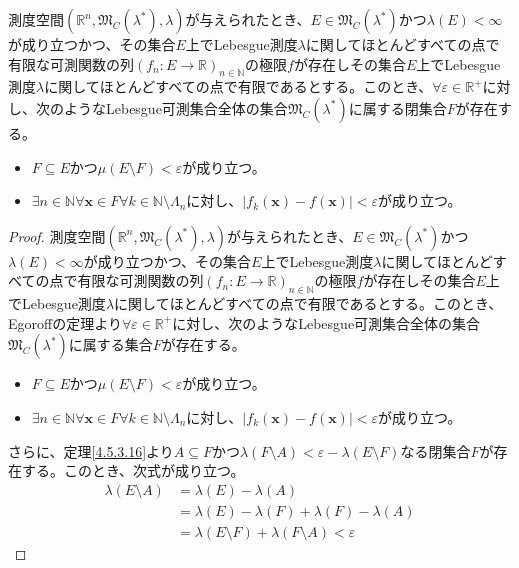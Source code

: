 \documentclass[dvipdfmx]{jsarticle}
\begin{document}
\begin{thm}\label{4.5.5.21}
測度空間$\left( \mathbb{R}^{n},\mathfrak{M}_{C}\left( \lambda^{*} \right),\lambda \right)$が与えられたとき、$E \in \mathfrak{M}_{C}\left( \lambda^{*} \right)$かつ$\lambda(E) < \infty$が成り立つかつ、その集合$E$上でLebesgue測度$\lambda$に関してほとんどすべての点で有限な可測関数の列$\left( f_{n}:E \rightarrow \mathbb{R} \right)_{n \in \mathbb{N}}$の極限$f$が存在しその集合$E$上でLebesgue測度$\lambda$に関してほとんどすべての点で有限であるとする。このとき、$\forall\varepsilon \in \mathbb{R}^{+}$に対し、次のようなLebesgue可測集合全体の集合$\mathfrak{M}_{C}\left( \lambda^{*} \right)$に属する閉集合$F$が存在する。
\begin{itemize}
\item
  $F \subseteq E$かつ$\mu(E \setminus F) < \varepsilon$が成り立つ。
\item
  $\exists n \in \mathbb{N}\forall\mathbf{x} \in F\forall k \in \mathbb{N} \setminus \varLambda_{n}$に対し、$\left| f_{k}\left( \mathbf{x} \right) - f\left( \mathbf{x} \right) \right| < \varepsilon$が成り立つ。
\end{itemize}
\end{thm}
\begin{proof}
測度空間$\left( \mathbb{R}^{n},\mathfrak{M}_{C}\left( \lambda^{*} \right),\lambda \right)$が与えられたとき、$E \in \mathfrak{M}_{C}\left( \lambda^{*} \right)$かつ$\lambda(E) < \infty$が成り立つかつ、その集合$E$上でLebesgue測度$\lambda$に関してほとんどすべての点で有限な可測関数の列$\left( f_{n}:E \rightarrow \mathbb{R} \right)_{n \in \mathbb{N}}$の極限$f$が存在しその集合$E$上でLebesgue測度$\lambda$に関してほとんどすべての点で有限であるとする。このとき、Egoroffの定理より$\forall\varepsilon \in \mathbb{R}^{+}$に対し、次のようなLebesgue可測集合全体の集合$\mathfrak{M}_{C}\left( \lambda^{*} \right)$に属する集合$F$が存在する。
\begin{itemize}
\item
  $F \subseteq E$かつ$\mu(E \setminus F) < \varepsilon$が成り立つ。
\item
  $\exists n \in \mathbb{N}\forall\mathbf{x} \in F\forall k \in \mathbb{N} \setminus \varLambda_{n}$に対し、$\left| f_{k}\left( \mathbf{x} \right) - f\left( \mathbf{x} \right) \right| < \varepsilon$が成り立つ。
\end{itemize}
さらに、定理\ref{4.5.3.16}より$A \subseteq F$かつ$\lambda(F \setminus A) < \varepsilon - \lambda(E \setminus F)$なる閉集合$F$が存在する。このとき、次式が成り立つ。
\begin{align*}
\lambda(E \setminus A) &= \lambda(E) - \lambda(A)\\
&= \lambda(E) - \lambda(F) + \lambda(F) - \lambda(A)\\
&= \lambda(E \setminus F) + \lambda(F \setminus A) < \varepsilon
\end{align*}
\end{proof}
\end{document}
